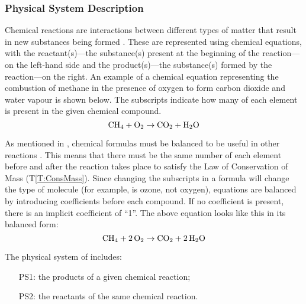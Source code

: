 \documentclass[12pt]{article}
\newcommand{\tref}[1]{T\ref{#1}}
\begin{document}
\subsubsection{Physical System Description} \label{sec_phySystDesc}
  
Chemical reactions are interactions between different types of matter that
result in new substances being formed \cite[p. 286]{lund_introduction_2023}. 
These are represented using chemical equations, with the reactant(s)---the
substance(s) present at the beginning of the reaction---on the left-hand side
and the product(s)---the substance(s) formed by the reaction---on the right. An
example of a chemical equation representing the combustion of methane in the
presence of oxygen to form carbon dioxide and water vapour is shown below. The
subscripts indicate how many of each element is present in the given chemical
compound.
$$
\ce{CH4} + \ce{O2} \rightarrow \ce{CO2} + \ce{H2O}
$$

 As mentioned in
, chemical formulas must be balanced to be
useful in other reactions \cite{lund_introduction_2023}. This means that there
must be the same number of each element before and after the reaction takes
place to satisfy the Law of Conservation of Mass (\tref{T:ConsMass}). Since
changing the subscripts in a formula will change the type of molecule (for
example,  is ozone, not oxygen), equations are balanced by introducing
coefficients before each compound. If no coefficient is present, there is an
implicit coefficient of ``1''. The above equation looks like this in its
balanced form:
$$
\ce{CH4} + \ce{2O2} \rightarrow \ce{CO2} + \ce{2H2O}
$$

The physical system of \progname{} includes:

\begin{itemize}

\item[PS1:] the products of a given chemical reaction;

\item[PS2:] the reactants of the same chemical reaction.

\end{itemize}

\end{document}
